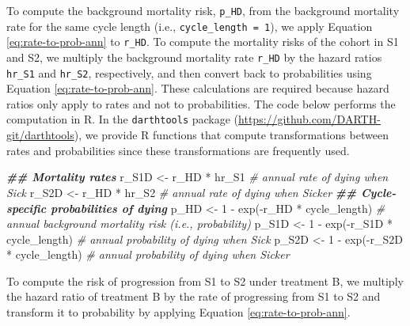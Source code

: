 \documentclass[
]{article}
\newenvironment{Shaded}{\begin{snugshade}}{\end{snugshade}}
\newcommand{\CommentTok}[1]{\textcolor[rgb]{0.56,0.35,0.01}{\textit{#1}}}
\newcommand{\DecValTok}[1]{\textcolor[rgb]{0.00,0.00,0.81}{#1}}
\newcommand{\DocumentationTok}[1]{\textcolor[rgb]{0.56,0.35,0.01}{\textbf{\textit{#1}}}}
\newcommand{\FunctionTok}[1]{\textcolor[rgb]{0.00,0.00,0.00}{#1}}
\newcommand{\NormalTok}[1]{#1}
\newcommand{\OtherTok}[1]{\textcolor[rgb]{0.56,0.35,0.01}{#1}}
\newcommand{\SpecialCharTok}[1]{\textcolor[rgb]{0.00,0.00,0.00}{#1}}
\begin{document}
To compute the background mortality risk, \texttt{p\_HD}, from the background mortality rate for the same cycle length (i.e., \texttt{cycle\_length\ =\ 1}), we apply Equation \eqref{eq:rate-to-prob-ann} to \texttt{r\_HD}. To compute the mortality risks of the cohort in S1 and S2, we multiply the background mortality rate \texttt{r\_HD} by the hazard ratios \texttt{hr\_S1} and \texttt{hr\_S2}, respectively, and then convert back to probabilities using Equation \eqref{eq:rate-to-prob-ann}. These calculations are required because hazard ratios only apply to rates and not to probabilities. The code below performs the computation in R. In the \texttt{darthtools} package (\url{https://github.com/DARTH-git/darthtools}), we provide R functions that compute transformations between rates and probabilities since these transformations are frequently used.

\begin{Shaded}
\begin{Highlighting}[]
\DocumentationTok{\#\# Mortality rates}
\NormalTok{r\_S1D }\OtherTok{\textless{}{-}}\NormalTok{ r\_HD }\SpecialCharTok{*}\NormalTok{ hr\_S1 }\CommentTok{\# annual rate of dying when Sick}
\NormalTok{r\_S2D }\OtherTok{\textless{}{-}}\NormalTok{ r\_HD }\SpecialCharTok{*}\NormalTok{ hr\_S2 }\CommentTok{\# annual rate of dying when Sicker}
\DocumentationTok{\#\# Cycle{-}specific probabilities of dying}
\NormalTok{p\_HD  }\OtherTok{\textless{}{-}} \DecValTok{1} \SpecialCharTok{{-}} \FunctionTok{exp}\NormalTok{(}\SpecialCharTok{{-}}\NormalTok{r\_HD }\SpecialCharTok{*}\NormalTok{ cycle\_length)  }\CommentTok{\# annual background mortality risk (i.e., probability)}
\NormalTok{p\_S1D }\OtherTok{\textless{}{-}} \DecValTok{1} \SpecialCharTok{{-}} \FunctionTok{exp}\NormalTok{(}\SpecialCharTok{{-}}\NormalTok{r\_S1D }\SpecialCharTok{*}\NormalTok{ cycle\_length) }\CommentTok{\# annual probability of dying when Sick}
\NormalTok{p\_S2D }\OtherTok{\textless{}{-}} \DecValTok{1} \SpecialCharTok{{-}} \FunctionTok{exp}\NormalTok{(}\SpecialCharTok{{-}}\NormalTok{r\_S2D }\SpecialCharTok{*}\NormalTok{ cycle\_length) }\CommentTok{\# annual probability of dying when Sicker}
\end{Highlighting}
\end{Shaded}

To compute the risk of progression from S1 to S2 under treatment B, we multiply the hazard ratio of treatment B by the rate of progressing from S1 to S2 and transform it to probability by applying Equation \eqref{eq:rate-to-prob-ann}.
\end{document}

